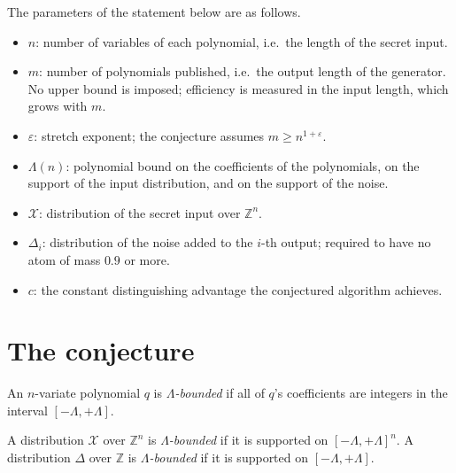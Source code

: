 \documentclass{aicr-conjecture}
\newcommand{\ZZ}{\mathbb{Z}}
\newcommand{\cX}{\mathcal{X}}
\begin{document}
The parameters of the statement below are as follows.

\begin{itemize}[leftmargin=1.2em]
\item $n$: number of variables of each polynomial, i.e.\ the length of
  the secret input.
\item $m$: number of polynomials published, i.e.\ the output length of
  the generator. No upper bound is imposed; efficiency is measured in
  the input length, which grows with $m$.
\item $\varepsilon$: stretch exponent; the conjecture assumes
  $m \ge n^{1+\varepsilon}$.
\item $\Lambda(n)$: polynomial bound on the coefficients of the
  polynomials, on the support of the input distribution, and on the
  support of the noise.
\item $\cX$: distribution of the secret input over $\ZZ^n$.
\item $\Delta_i$: distribution of the noise added to the $i$-th output;
  required to have no atom of mass $0.9$ or more.
\item $c$: the constant distinguishing advantage the conjectured
  algorithm achieves.
\end{itemize}

\section{The conjecture}\label{sec:conjectures}

\begin{definition}\label{def:boundedpoly}
An $n$-variate polynomial $q$ is \emph{$\Lambda$-bounded} if all of
$q$'s coefficients are integers in the interval
$[-\Lambda, +\Lambda]$.
\end{definition}

\begin{definition}\label{def:bounddist}
A distribution $\cX$ over $\ZZ^n$ is \emph{$\Lambda$-bounded} if it is
supported on $[-\Lambda, +\Lambda]^n$. A distribution $\Delta$ over
$\ZZ$ is \emph{$\Lambda$-bounded} if it is supported on
$[-\Lambda, +\Lambda]$.
\end{definition}
\end{document}

